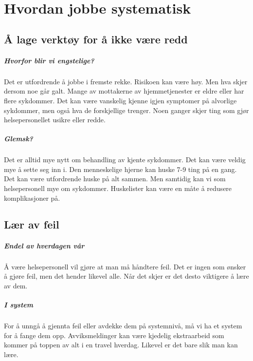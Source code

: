 	\chapter{Hvordan jobbe systematisk}
		\section{Å lage verktøy for å ikke være redd}
			\paragraph{Hvorfor blir vi engstelige?\\}
				Det er utfordrende å jobbe i fremste rekke. Risikoen kan være høy. Men hva skjer dersom noe går galt. Mange av mottakerne av hjemmetjenester er eldre eller har flere sykdommer. Det kan være vanskelig kjenne igjen symptomer på alvorlige sykdommer, men også hva de forskjellige trenger. Noen ganger skjer ting som gjør helsepersonellet usikre eller redde.
			\paragraph{Glemsk?\\}
				Det er alltid mye nytt om behandling av kjente sykdommer. Det kan være veldig mye å sette seg inn i. Den menneskelige hjerne kan huske 7-9 ting på en gang. Det kan være utfordrende huske på alt sammen. Men samtidig kan vi som helsepersonell mye om sykdommer. Huskelister kan være en måte å redusere komplikasjoner på\cite{FA-gawande}.
		\section{Lær av feil}
			\paragraph{Endel av hverdagen vår\\}
				Å være helsepersonell vil gjøre at man må håndtere feil. Det er ingen som ønsker å gjøre feil, men det hender likevel alle. Når det skjer er det desto viktigere å lære av dem.
			\paragraph{I system\\}
				For å unngå å gjennta feil eller avdekke dem på systemnivå, må vi ha et system for å fange dem opp. Avviksmeldinger kan være kjedelig ekstraarbeid som kommer på toppen av alt i en travel hverdag. Likevel er det bare slik man kan lære.
